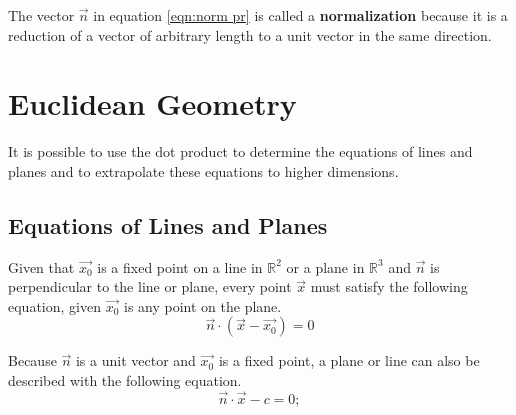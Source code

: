 \documentclass[11pt]{article}
\begin{document}
		The vector $\vec{n}$ in equation \ref{eqn:norm pr} is called a \textbf{normalization} because it is a reduction of a vector of arbitrary length to a unit vector in the same direction.
		
\section{Euclidean Geometry}
	It is possible to use the dot product to determine the equations of lines and planes and to extrapolate these equations to higher dimensions.
	
	\subsection{Equations of Lines and Planes}
		Given that $\vec{x_0}$ is a fixed point on a line in $\mathbb{R}^2$ or a plane in $\mathbb{R}^3$ and $\vec{n}$ is perpendicular to the line or plane, every point $\vec{x}$ must satisfy the following equation, given $\vec{x_0}$ is any point on the plane.
		\begin{equation}
			\vec{n}\cdot(\vec{x}-\vec{x_0}) = 0
			\label{eqn:plane}
		\end{equation}
		
		Because $\vec{n}$ is a unit vector and $\vec{x_0}$ is a fixed point, a plane or line can also be described with the following equation.
		\begin{equation}
			\vec{n}\cdot\vec{x} - c = 0;
		\end{equation}
		
\end{document}
